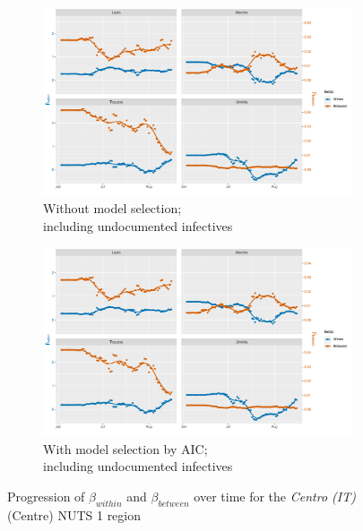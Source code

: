 \documentclass[12pt]{article}
\begin{document}
\begin{appendices}
\begin{figure}[H]
\begin{subfigure}{\textwidth}
    	      \includegraphics[width=0.95\linewidth]{output/model3_lag3_betas_Centro (IT)_UndocQuadratic_rolling.pdf}
    	      \caption{Without model selection; \\ including undocumented infectives}
    	      \label{fig:beta_within_between_over_time_centro_regular_undoc}
    	    \end{subfigure}\newline
    	    \begin{subfigure}{\textwidth}
    	      \centering
    	      \includegraphics[width=0.95\linewidth]{output/model3_lag3_betas_Centro (IT)_aic_UndocQuadratic_rolling.pdf}
    	      \caption{With model selection by AIC; \\ including undocumented infectives}
    	      \label{fig:beta_within_between_over_time_centro_aic_undoc}
    	    \end{subfigure}
    	    \caption{Progression of $\beta_{within}$ and $\beta_{between}$ over time for the \textit{Centro (IT)} (Centre) NUTS 1 region}
    	    \label{fig:beta_within_between_over_time_centro}
        \end{figure}
		

\end{appendices}
\end{document}
